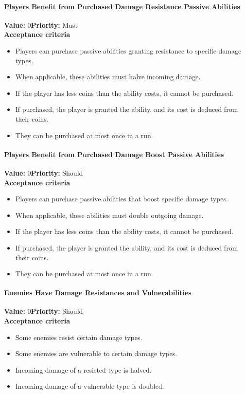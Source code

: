 \paragraph{Players Benefit from Purchased Damage Resistance Passive Abilities}
\textbf{Value:} 0\quad \textbf{Priority:} Must\\
\textbf{Acceptance criteria}
\begin{itemize}
  \item Players can purchase passive abilities granting resistance to specific damage types.
  \item When applicable, these abilities must halve incoming damage.
  \item If the player has less coins than the ability costs, it cannot be purchased. 
  \item If purchased, the player is granted the ability, and its cost is deduced from their coins. 
  \item They can be purchased at most once in a run. 
\end{itemize}

\paragraph{Players Benefit from Purchased Damage Boost Passive Abilities}
\textbf{Value:} 0\quad \textbf{Priority:} Should\\
\textbf{Acceptance criteria}
\begin{itemize}
  \item Players can purchase passive abilities that boost specific damage types.
  \item When applicable, these abilities must double outgoing damage.
  \item If the player has less coins than the ability costs, it cannot be purchased. 
  \item If purchased, the player is granted the ability, and its cost is deduced from their coins. 
  \item They can be purchased at most once in a run. 
\end{itemize}

\paragraph{Enemies Have Damage Resistances and Vulnerabilities}
\textbf{Value:} 0\quad \textbf{Priority:} Should\\
\textbf{Acceptance criteria}
\begin{itemize}
  \item Some enemies resist certain damage types.
  \item Some enemies are vulnerable to certain damage types.
  \item Incoming damage of a resisted type is halved.
  \item Incoming damage of a vulnerable type is doubled.
\end{itemize}

